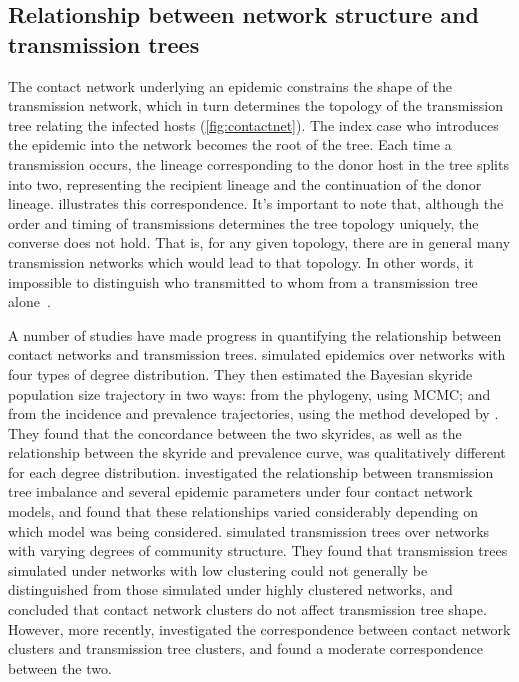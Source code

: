 \subsection{Relationship between network structure and transmission trees}

The contact network underlying an epidemic constrains the shape of the
transmission network, which in turn determines the topology of the transmission
tree relating the infected hosts (\cref{fig:contactnet}). The index case who
introduces the epidemic into the network becomes the root of the tree. Each
time a transmission occurs, the lineage corresponding to the donor host in the
tree splits into two, representing the recipient lineage and the continuation
of the donor lineage.  illustrates this correspondence.
It's important to note that, although the order and timing of transmissions
determines the tree topology uniquely, the converse does not hold. That is, for
any given topology, there are in general many transmission networks which would
lead to that topology. In other words, it impossible to distinguish who
transmitted to whom from a transmission tree alone~\autocite{bernard2007hiv}.

A number of studies have made progress in quantifying the relationship between
contact networks and transmission trees. \textcite{o2010contact} simulated
epidemics over networks with four types of degree distribution. They then
estimated the Bayesian skyride~\autocite{minin2008smooth} population size
trajectory in two ways: from the phylogeny, using \gls{MCMC}; and from the
incidence and prevalence trajectories, using the method developed by 
\textcite{volz2009phylodynamics}. They found that the concordance between
the two skyrides, as well as the relationship between the skyride and
prevalence curve, was qualitatively different for each degree distribution.
\textcite{leventhal2012inferring} investigated the relationship between
transmission tree imbalance and several epidemic parameters under four contact
network models, and found that these relationships varied considerably
depending on which model was being considered. \textcite{welch2011network}
simulated transmission trees over networks with varying degrees of community
structure. They found that transmission trees simulated under networks with low
clustering could not generally be distinguished from those simulated under
highly clustered networks, and concluded that contact network clusters do not
affect transmission tree shape. However, more recently,
\textcite{villandre2016assessment} investigated the correspondence between
contact network clusters and transmission tree clusters, and found a moderate
correspondence between the two.

